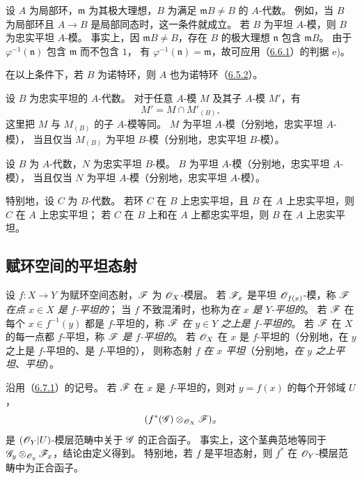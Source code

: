 设 $A$ 为局部环，$\mathfrak m$ 为其极大理想，$B$ 为满足 $\mathfrak mB\ne B$ 的 $A$-代数。
例如，当 $B$ 为局部环且 $A\to B$ 是局部同态时，这一条件就成立。
若 $B$ 为平坦 $A$-模，则 $B$ 为忠实平坦 $A$-模。
事实上，因 $\mathfrak mB\ne B$，存在 $B$ 的极大理想 $\mathfrak n$ 包含 $\mathfrak mB$。
由于 $\varphi^{-1}(\mathfrak n)$ 包含 $\mathfrak m$ 而不包含 $1$，
有 $\varphi^{-1}(\mathfrak n)=\mathfrak m$，故可应用（\hyperlink{para:0:6.6.1}{6.6.1}）的判据 e)。

在以上条件下，若 $B$ 为诺特环，则 $A$ 也为诺特环（\hyperlink{para:0:6.5.2}{6.5.2}）。

设 $B$ 为忠实平坦的 $A$-代数。
对于任意 $A$-模 $M$ 及其子 $A$-模 $M'$，有
\[
 M'=M\cap M'_{(B)},
\]
这里把 $M$ 与 $M_{(B)}$ 的子 $A$-模等同。
$M$ 为平坦 $A$-模（分别地，忠实平坦 $A$-模），
当且仅当 $M_{(B)}$ 为平坦 $B$-模（分别地，忠实平坦 $B$-模）。

设 $B$ 为 $A$-代数，$N$ 为忠实平坦 $B$-模。
$B$ 为平坦 $A$-模（分别地，忠实平坦 $A$-模），
当且仅当 $N$ 为平坦 $A$-模（分别地，忠实平坦 $A$-模）。

特别地，设 $C$ 为 $B$-代数。
若环 $C$ 在 $B$ 上忠实平坦，且 $B$ 在 $A$ 上忠实平坦，则 $C$ 在 $A$ 上忠实平坦；
若 $C$ 在 $B$ 上和在 $A$ 上都忠实平坦，则 $B$ 在 $A$ 上忠实平坦。

\subsection{赋环空间的平坦态射}\hypertarget{heading:0:6.7}{}

设 $f\colon X\to Y$ 为赋环空间态射，$\mathscr F$ 为 $\mathscr O_X$-模层。
若 $\mathscr F_x$ 是平坦 $\mathscr O_{f(x)}$-模，称 $\mathscr F$ \emph{在点 $x\in X$ 是 $f$-平坦的}；
当 $f$ 不致混淆时，也称为\emph{在 $x$ 是 $Y$-平坦的}。
若 $\mathscr F$ 在每个 $x\in f^{-1}(y)$ 都是 $f$-平坦的，称 $\mathscr F$ \emph{在 $y\in Y$ 之上是 $f$-平坦的}。
若 $\mathscr F$ 在 $X$ 的每一点都 $f$-平坦，称 $\mathscr F$ \emph{是 $f$-平坦的}。
若 $\mathscr O_X$ 在 $x$ 是 $f$-平坦的（分别地，在 $y$ 之上是 $f$-平坦的、是 $f$-平坦的），
则称态射 $f$ \emph{在 $x$ 平坦}（分别地，\emph{在 $y$ 之上平坦}、\emph{平坦}）。

沿用（\hyperlink{para:0:6.7.1}{6.7.1}）的记号。
若 $\mathscr F$ 在 $x$ 是 $f$-平坦的，则对 $y=f(x)$ 的每个开邻域 $U$，
\[
 (f^*(\mathscr G)\otimes_{\mathscr O_X}\mathscr F)_x
\]
是 $(\mathscr O_Y|U)$-模层范畴中关于 $\mathscr G$ 的正合函子。
事实上，这个茎典范地等同于 $\mathscr G_y\otimes_{\mathscr O_y}\mathscr F_x$，结论由定义得到。
特别地，若 $f$ 是平坦态射，则 $f^*$ 在 $\mathscr O_Y$-模层范畴中为正合函子。

